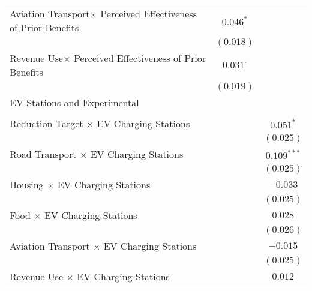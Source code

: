\begin{center}
\begin{tiny}
\begin{longtable}{l@{} c@{} c@{}}
\quad Aviation Transport$\times$ Perceived Effectiveness of Prior Benefits & $0.046^{*}$     &                \\
                                                                           & $(0.018)$       &                \\
\quad Revenue Use$\times$ Perceived Effectiveness of Prior Benefits        & $0.031^{\cdot}$ &                \\
                                                                           & $(0.019)$       &                \\
EV Stations and Experimental                                               &                 &                \\
                                                                           &                 &                \\
\quad Reduction Target $\times$ EV Charging Stations                       &                 & $0.051^{*}$    \\
                                                                           &                 & $(0.025)$      \\
\quad Road Transport $\times$ EV Charging Stations                         &                 & $0.109^{***}$  \\
                                                                           &                 & $(0.025)$      \\
\quad Housing $\times$ EV Charging Stations                                &                 & $-0.033$       \\
                                                                           &                 & $(0.025)$      \\
\quad Food $\times$ EV Charging Stations                                   &                 & $0.028$        \\
                                                                           &                 & $(0.026)$      \\
\quad Aviation Transport $\times$ EV Charging Stations                     &                 & $-0.015$       \\
                                                                           &                 & $(0.025)$      \\
\quad Revenue Use $\times$ EV Charging Stations                            &                 & $0.012$        \\

\end{longtable}
\end{tiny}
\end{center}
